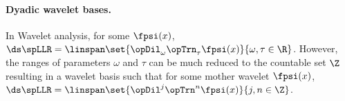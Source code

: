 
%
%

\paragraph{Dyadic wavelet bases.}
In Wavelet analysis, for some   $\fpsi(x)$,
  \\\indentx$\ds\spLLR=\linspan\set{\opDil_\omega\opTrn_\tau \fpsi(x)}{\omega,\tau\in\R}$.
However, the ranges of parameters $\omega$ and $\tau$ can be much reduced to the countable set $\Z$ resulting in
a  wavelet basis such that for some mother wavelet $\fpsi(x)$,
  \\\indentx$\ds\spLLR=\linspan\set{\opDil^j\opTrn^n \fpsi(x)}{j,n\in\Z}$.

